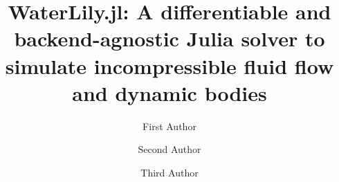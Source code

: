 \documentclass[final,3p,times]{elsarticle}
\begin{document}
\begin{frontmatter}



\title{WaterLily.jl: A differentiable and backend-agnostic Julia solver to simulate incompressible fluid flow and dynamic bodies}


\author[a]{First Author}
\author[a,b]{Second Author}
\author[b]{Third Author}

\address[a]{First Address}
\address[b]{Second Address}




\end{frontmatter}
\end{document}
